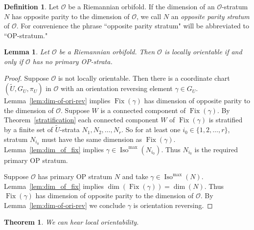 \documentclass{amsart}
\theoremstyle{plain}
\newtheorem{theorem}[thm]{Theorem}
\newtheorem{lemma}[thm]{Lemma}
\theoremstyle{definition}
\newtheorem{definition}[thm]{Definition}
\theoremstyle{remark}
\newcommand{\wtu}{\widetilde{U}}
\newcommand{\orb}{\mathcal O}
\newcommand{\cc}{(\widetilde{U}, G_U, \pi_U)}
\DeclareMathOperator{\iso}{Iso}
\DeclareMathOperator{\fix}{Fix}
\begin{document}
\begin{definition} Let $\orb$ be a Riemannian orbifold. If the dimension of an $\orb$-stratum $N$ has opposite parity to the dimension of $\orb$, we call $N$ an \emph{opposite parity stratum} of $\orb$. For convenience the phrase ``opposite parity stratum" will be abbreviated to ``OP-stratum."
\end{definition}

\begin{lemma}\label{orinop} Let $\orb$ be a Riemannian orbifold. Then $\orb$ is locally orientable if and only if $\orb$ has no primary OP-strata.
\end{lemma}

\begin{proof}
Suppose $\orb$ is not locally orientable. Then there is a coordinate chart $\cc$ in $\orb$ with an orientation reversing element $\gamma \in G_U$. Lemma~\ref{lem:dim-of-ori-rev} implies $\fix(\gamma)$ has dimension of opposite parity to the dimension of $\orb$. Suppose $W$ is a connected component of  $\fix(\gamma)$. By Theorem~\ref{stratification} each connected component $W$ of  $\fix(\gamma)$ is stratified by a finite set of $\wtu$-strata $N_1, N_2, \dots, N_r$. So for at least one $i_0 \in \{1, 2, \dots, r\}$, stratum $N_{i_0}$ must have the same dimension as $\fix(\gamma)$. Lemma~\ref{lem:dim_of_fix} implies $\gamma \in \iso^{\max}(N_{i_0})$. Thus $N_{i_0}$ is the required primary OP stratum.

Suppose $\orb$ has primary OP stratum $N$ and take $\gamma \in \iso^{\max}(N)$. Lemma~\ref{lem:dim_of_fix} implies $\dim(\fix(\gamma))= \dim(N)$. Thus $\fix(\gamma)$ has dimension of opposite parity to the dimension of $\orb$. By Lemma~\ref{lem:dim-of-ori-rev} we conclude $\gamma$ is orientation reversing.
\end{proof}


\begin{theorem}  We can hear local orientability.
\end{theorem}
\end{document}
